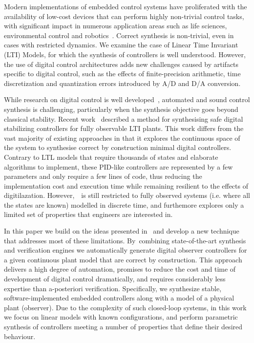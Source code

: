 \documentclass[sigconf]{llncs}
\begin{document}
Modern implementations of embedded control systems have proliferated with
the availability of low-cost devices that can perform highly non-trivial
control tasks, with significant impact in numerous application areas such as
life sciences, environmental control and robotics~\cite{astrom1997computer,Franklin15}.  Correct synthesis is non-trivial, even in cases with
restricted dynamics.  We examine the case of Linear Time Invariant (LTI)
Models, for which the synthesis of controllers is well understood.  However,
the use of digital control architectures adds new challenges caused by
artifacts specific to digital control, such as the effects of
finite-precision arithmetic, time discretization and quantization errors
introduced by A/D and D/A conversion.

While research on digital control is well
developed~\cite{astrom1997computer}, automated and sound control synthesis
is challenging, particularly when the synthesis objective goes beyond
classical stability.  Recent work~\cite{abate2017automated} described a
method for synthesising safe digital stabilizing controllers for fully
observable LTI plants.  This work differs from the vast majority of existing
approaches in that it explores the continuous space of the system to
synthesise correct by construction minimal digital controllers.  Contrary to
LTL models that require thousands of states and elaborate algorithms to
implement, these PID-like controllers are represented by a few parameters
and only require a few lines of code, thus reducing the implementation cost
and execution time while remaining resilient to the effects of digitilazation.
However,~\cite{abate2017automated}~is still restricted to fully observed
systems (i.e. where all the states are known) modelled in discrete time,
and furthemore explores only a limited set of properties that engineers
are interested in.

In this paper we build on the ideas presented in~\cite{abate2017automated}
and develop a new technique that addresses most of these limitations. 
By~combining state-of-the-art synthesis and verification engines we
automatically generate digital observer controllers for a given continuous
plant model that are correct by construction.  This approach delivers a high
degree of automation, promises to reduce the cost and time of development of
digital control dramatically, and requires considerably less expertise than
a-posteriori verification.  Specifically, we synthesize stable,
software-implemented embedded controllers along with a model of a physical
plant (observer).  Due to the complexity of such closed-loop systems, in
this work we focus on linear models with known configurations, and perform
parametric synthesis of controllers meeting a number of properties that
define their desired behaviour.
\end{document}
